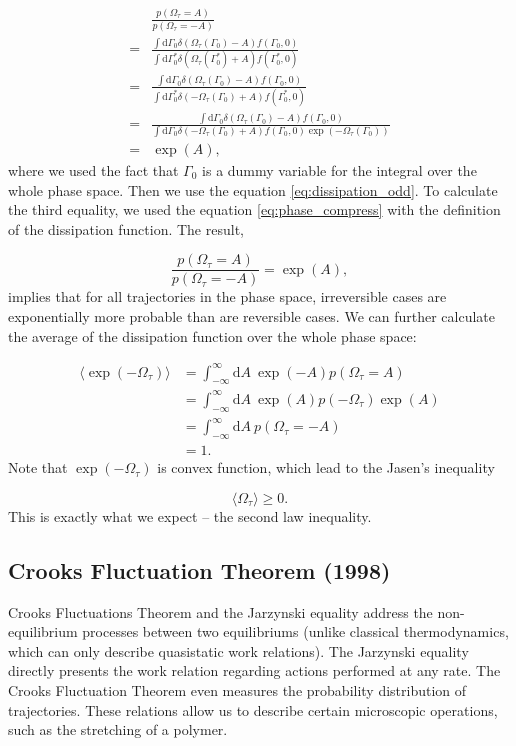 \documentclass[ reprint, amsmath,amssymb, aps,]{revtex4-1}
\begin{document}
\begin{equation}
\begin{aligned}
&\frac{p(\Omega_\tau= A)}{p(\Omega_\tau= -A)}\\
=&\frac{\int\mathrm{d}\Gamma_0\delta(\Omega_\tau(\Gamma_0)-A)f(\Gamma_0,0)}{\int\mathrm{d}\Gamma_0^*\delta(\Omega_\tau(\Gamma_0^*)+A)f(\Gamma_0^*,0)}\\
=&\frac{\int\mathrm{d}\Gamma_0\delta(\Omega_\tau(\Gamma_0)-A)f(\Gamma_0,0)}{\int\mathrm{d}\Gamma_0^*\delta(-\Omega_\tau(\Gamma_0)+A)f(\Gamma_0^*
,0)}\\
=&\frac{\int\mathrm{d}\Gamma_0\delta(\Omega_\tau(\Gamma_0)-A)f(\Gamma_0,0)}{\int\mathrm{d}\Gamma_0\delta(-\Omega_\tau(\Gamma_0)+A)f(\Gamma_0,0)\exp(-{\Omega}_\tau(\Gamma_0))}\\
=&\exp(A),
\end{aligned}
\end{equation}
where we used the fact that $\Gamma_0$ is a dummy variable for the integral over the whole phase space. Then we use the equation \ref{eq:dissipation_odd}. To calculate the third equality, we used the equation \ref{eq:phase_compress} with the definition of the dissipation function. The result,

\begin{equation}
\frac{p(\Omega_\tau=A)}{p(\Omega_\tau=-A)}=\exp(A),
\end{equation}
implies that for all trajectories in the phase space, irreversible cases are exponentially more probable than are reversible cases. We can further calculate the average of the dissipation function over the whole phase space:

\[
 \begin{aligned}\label{eq:devESFT}
\langle \exp(-{\Omega}_\tau) \rangle
&=\int_{-\infty}^\infty \mathrm{d}A\ \exp(-A)p({\Omega}_\tau=A)\\
&=\int_{-\infty}^\infty \mathrm{d}A\  \exp(A)p(-{\Omega}_\tau)\exp(A)\\
&=\int_{-\infty}^\infty \mathrm{d}A\  p({\Omega}_\tau=-A)\\
&=1.
\end{aligned}
\]
Note that $\exp(-\Omega_\tau)$  is convex function, which lead to the Jasen's inequality

\begin{equation}
\langle \Omega_\tau\rangle \geq 0.
\end{equation}
This is exactly what we expect -- the second law inequality.

\subsection{Crooks Fluctuation Theorem (1998)}
Crooks Fluctuations Theorem and the Jarzynski equality address the non-equilibrium processes between two equilibriums (unlike classical thermodynamics, which can only describe quasistatic work relations). The Jarzynski equality directly presents the work relation regarding actions performed at any rate. The Crooks Fluctuation Theorem even measures the probability distribution of trajectories. These relations allow us to describe certain microscopic operations, such as the stretching of a polymer.
\end{document}
